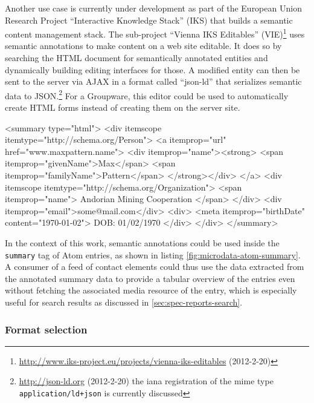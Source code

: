 \documentclass[11pt,a4paper,headsepline,twoside]{scrartcl}		%
\newcommand{\citeurl}[2]{\url{#1} (#2)}
\begin{document}
Another use case is currently under development as part of the European Union
Research Project ``Interactive Knowledge Stack'' (IKS) that builds a semantic
content management stack. The sub-project ``Vienna IKS Editables''
(VIE)\footnote{\citeurl{http://www.iks-project.eu/projects/vienna-iks-editables}{2012-2-20}}
uses semantic annotations to make content on a web site editable. It does so by
searching the HTML document for semantically annotated entities and dynamically
building editing interfaces for those. A modified entity can then be sent to the
server via AJAX in a format called ``json-ld'' that serializes semantic data to
JSON.\footnote{\citeurl{http://json-ld.org}{2012-2-20} the iana registration of
  the mime type \lstinline:application/ld+json: is currently discussed} For a
Groupware, this editor could be used to automatically create HTML forms instead
of creating them on the server site.

\begin{anylisting}[label=fig:microdata-atom-summary,
                   language=xml,
                   caption={Microdata used in the summary of an ATOM entry summary (markup not escaped for clarity)}]
<summary type="html">
  <div itemscope itemtype="http://schema.org/Person">
    <a itemprop="url" href="www.maxpattern.name">
      <div itemprop="name"><strong>
        <span itemprop="givenName">Max</span>
        <span itemprop="familyName">Pattern</span>
      </strong></div>
    </a>
    <div itemscope
         itemtype="http://schema.org/Organization">
      <span itemprop="name">
        Andorian Mining Cooperation
      </span>
    </div>
    <div itemprop="email">some@mail.com</div>
    <div>
      <meta itemprop="birthDate" content="1970-01-02">
      DOB: 01/02/1970
    </div>
  </div>
</summary>  
\end{anylisting}

In the context of this work, semantic annotations could be used inside the
\lstinline:summary: tag of Atom entries, as shown in listing
\ref{fig:microdata-atom-summary}. A consumer of a feed of contact elements could
thus use the data extracted from the annotated summary data to provide a tabular
overview of the entries even without fetching the associated media resource of
the entry, which is especially useful for search results as discussed in
\autoref{sec:spec-reports-search}.

\subsubsection{Format selection}
\end{document}
